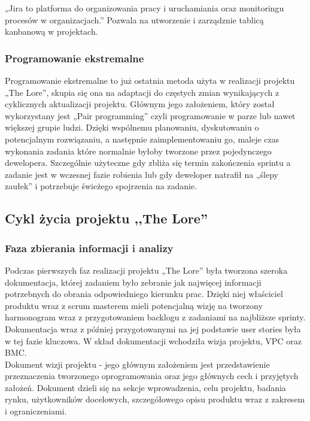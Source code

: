 \documentclass[oneside,polski,logo]{amuthesis}
\begin{document}
„Jira to platforma do organizowania pracy i uruchamiania oraz monitoringu procesów w organizacjach.”  \cite{jira} Pozwala na utworzenie i zarządznie tablicą kanbanową w projektach.

\subsubsection{Programowanie ekstremalne}

Programowanie ekstremalne to już ostatnia metoda użyta w realizacji projektu „The Lore”, skupia się ona na adaptacji do częstych zmian wynikających z cyklicznych aktualizacji projektu. Głównym jego założeniem, który został wykorzystany jest „Pair programming” czyli programowanie w parze lub nawet większej grupie ludzi. Dzięki wspólnemu planowaniu, dyskutowaniu o potencjalnym rozwiązaniu, a następnie zaimplementowaniu go, maleje czas wykonania zadania które normalnie byłoby tworzone przez pojedynczego dewelopera. Szczególnie użyteczne gdy zbliża się termin zakończenia sprintu a zadanie jest w wczesnej fazie robienia lub gdy deweloper natrafił na „ślepy zaułek” i potrzebuje świeżego spojrzenia na zadanie. \\

\subsection{Cykl życia projektu ,,The Lore''}

\subsubsection{Faza zbierania informacji i analizy}

Podczas pierwszych faz realizacji projektu „The Lore” była tworzona szeroka dokumentacja, której zadaniem było zebranie jak najwięcej informacji potrzebnych do obrania odpowiedniego kierunku prac. Dzięki niej właściciel produktu wraz z scrum masterem mieli potencjalną wizję na tworzony harmonogram wraz z przygotowaniem backlogu z zadaniami na najbliższe sprinty. Dokumentacja wraz z później przygotowanymi na jej podstawie user stories była w tej fazie kluczowa. W skład dokumentacji wchodziła wizja projektu, VPC oraz BMC.\\

Dokument wizji projektu - jego głównym założeniem jest przedstawienie przeznaczenia tworzonego oprogramowania oraz jego głównych cech i przyjętych założeń. Dokument dzieli się na sekcje wprowadzenia, celu projektu, badania rynku, użytkowników docelowych, szczegółowego opisu produktu wraz z zakresem i ograniczeniami. \\
\end{document}
